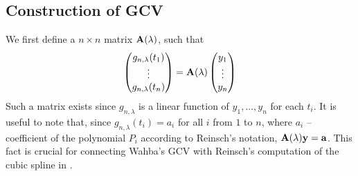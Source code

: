 \documentclass[11pt,leqno]{book}
\theoremstyle{definition}
\theoremstyle{plain}
\theoremstyle{definition}
\begin{document}
{\subsection{Construction of GCV}
We first define a $n \times n$ matrix $\vb{A}(\lambda)$, such that \begin{equation}
\begin{pmatrix}
g_{n,\lambda}(t_1) \\
\vdots\\
g_{n,\lambda}(t_n)
\end{pmatrix}
 = \vb{A}(\lambda)
\begin{pmatrix}
{y}_1 \\
\vdots\\
{y}_n
\end{pmatrix}
\label{eq:matrixA}
\end{equation}
Such a matrix exists since $g_{n,\lambda}$ is a linear function of ${y}_1,..., {y}_n$ for each $t_i$. It is useful to note that, since $g_{n,\lambda}(t_i) = {a}_i$ for all $i$ from $1$ to $n$, where ${a}_i$ --  coefficient of the polynomial $P_i$ according to Reinsch's notation, $\vb{A}(\lambda){\vb{y}} = {\vb{a}}$. This fact is crucial for connecting Wahba's GCV with Reinsch's computation of the cubic spline in \cite{REINSCH1967}.

}
\end{document}
